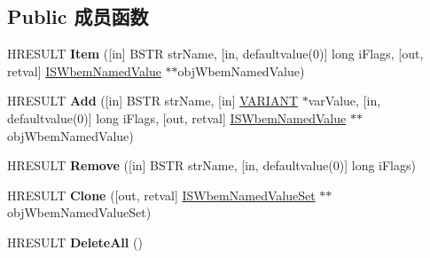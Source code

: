 \subsection*{Public 成员函数}
\begin{DoxyCompactItemize}
\item 
\mbox{\label{interface_wbem_scripting_1_1_i_s_wbem_named_value_set_a4324be0e678c5ed080b05f05a91f3c04}} 
H\+R\+E\+S\+U\+LT {\bfseries Item} (\mbox{[}in\mbox{]} B\+S\+TR str\+Name, \mbox{[}in, defaultvalue(0)\mbox{]} long i\+Flags, \mbox{[}out, retval\mbox{]} \hyperlink{interface_wbem_scripting_1_1_i_s_wbem_named_value}{I\+S\+Wbem\+Named\+Value} $\ast$$\ast$obj\+Wbem\+Named\+Value)
\item 
\mbox{\label{interface_wbem_scripting_1_1_i_s_wbem_named_value_set_a9db279531aadfabd9ae8b3341b9f2b4a}} 
H\+R\+E\+S\+U\+LT {\bfseries Add} (\mbox{[}in\mbox{]} B\+S\+TR str\+Name, \mbox{[}in\mbox{]} \hyperlink{structtag_v_a_r_i_a_n_t}{V\+A\+R\+I\+A\+NT} $\ast$var\+Value, \mbox{[}in, defaultvalue(0)\mbox{]} long i\+Flags, \mbox{[}out, retval\mbox{]} \hyperlink{interface_wbem_scripting_1_1_i_s_wbem_named_value}{I\+S\+Wbem\+Named\+Value} $\ast$$\ast$obj\+Wbem\+Named\+Value)
\item 
\mbox{\label{interface_wbem_scripting_1_1_i_s_wbem_named_value_set_a23122c958c9347f0c9758a64b6e5a1b2}} 
H\+R\+E\+S\+U\+LT {\bfseries Remove} (\mbox{[}in\mbox{]} B\+S\+TR str\+Name, \mbox{[}in, defaultvalue(0)\mbox{]} long i\+Flags)
\item 
\mbox{\label{interface_wbem_scripting_1_1_i_s_wbem_named_value_set_a3531013fff05864a5d0ad7de8bf3fb21}} 
H\+R\+E\+S\+U\+LT {\bfseries Clone} (\mbox{[}out, retval\mbox{]} \hyperlink{interface_wbem_scripting_1_1_i_s_wbem_named_value_set}{I\+S\+Wbem\+Named\+Value\+Set} $\ast$$\ast$obj\+Wbem\+Named\+Value\+Set)
\item 
\mbox{\label{interface_wbem_scripting_1_1_i_s_wbem_named_value_set_a15125dd32abb6f6e60afac4660d21b15}} 
H\+R\+E\+S\+U\+LT {\bfseries Delete\+All} ()
\end{DoxyCompactItemize}
